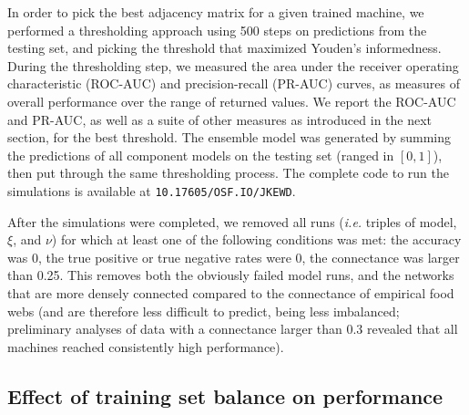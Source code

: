 \documentclass[11pt]{article}
\begin{document}
In order to pick the best adjacency matrix for a given trained machine,
we performed a thresholding approach using 500 steps on predictions from
the testing set, and picking the threshold that maximized Youden's
informedness. During the thresholding step, we measured the area under
the receiver operating characteristic (ROC-AUC) and precision-recall
(PR-AUC) curves, as measures of overall performance over the range of
returned values. We report the ROC-AUC and PR-AUC, as well as a suite of
other measures as introduced in the next section, for the best
threshold. The ensemble model was generated by summing the predictions
of all component models on the testing set (ranged in \([0,1]\)), then
put through the same thresholding process. The complete code to run the
simulations is available at \texttt{10.17605/OSF.IO/JKEWD}.

After the simulations were completed, we removed all runs (\emph{i.e.}
triples of model, \(\xi\), and \(\nu\)) for which at least one of the
following conditions was met: the accuracy was 0, the true positive or
true negative rates were 0, the connectance was larger than 0.25. This
removes both the obviously failed model runs, and the networks that are
more densely connected compared to the connectance of empirical food
webs (and are therefore less difficult to predict, being less
imbalanced; preliminary analyses of data with a connectance larger than
0.3 revealed that all machines reached consistently high performance).

\hypertarget{effect-of-training-set-balance-on-performance}{%
\subsection{Effect of training set balance on
performance}\label{effect-of-training-set-balance-on-performance}}
\end{document}
